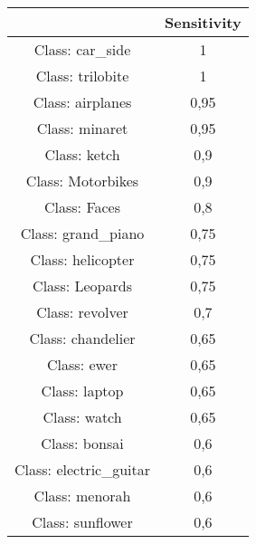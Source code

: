 \begin{table}[H]
\centering
\begin{tabular}{|cc|}
\hline
                                              & \textbf{Sensitivity}      \\ \hline
\multicolumn{1}{|c|}{Class: car\_side}        & \multicolumn{1}{c|}{1}    \\ \hline
\multicolumn{1}{|c|}{Class: trilobite}        & \multicolumn{1}{c|}{1}    \\ \hline
\multicolumn{1}{|c|}{Class: airplanes}        & \multicolumn{1}{c|}{0,95} \\ \hline
\multicolumn{1}{|c|}{Class: minaret}          & \multicolumn{1}{c|}{0,95} \\ \hline
\multicolumn{1}{|c|}{Class: ketch}            & \multicolumn{1}{c|}{0,9}  \\ \hline
\multicolumn{1}{|c|}{Class: Motorbikes}       & \multicolumn{1}{c|}{0,9}  \\ \hline
\multicolumn{1}{|c|}{Class: Faces}            & \multicolumn{1}{c|}{0,8}  \\ \hline
\multicolumn{1}{|c|}{Class: grand\_piano}     & \multicolumn{1}{c|}{0,75} \\ \hline
\multicolumn{1}{|c|}{Class: helicopter}       & \multicolumn{1}{c|}{0,75} \\ \hline
\multicolumn{1}{|c|}{Class: Leopards}         & \multicolumn{1}{c|}{0,75} \\ \hline
\multicolumn{1}{|c|}{Class: revolver}         & \multicolumn{1}{c|}{0,7}  \\ \hline
\multicolumn{1}{|c|}{Class: chandelier}       & \multicolumn{1}{c|}{0,65} \\ \hline
\multicolumn{1}{|c|}{Class: ewer}             & \multicolumn{1}{c|}{0,65} \\ \hline
\multicolumn{1}{|c|}{Class: laptop}           & \multicolumn{1}{c|}{0,65} \\ \hline
\multicolumn{1}{|c|}{Class: watch}            & \multicolumn{1}{c|}{0,65} \\ \hline
\multicolumn{1}{|c|}{Class: bonsai}           & \multicolumn{1}{c|}{0,6}  \\ \hline
\multicolumn{1}{|c|}{Class: electric\_guitar} & \multicolumn{1}{c|}{0,6}  \\ \hline
\multicolumn{1}{|c|}{Class: menorah}          & \multicolumn{1}{c|}{0,6}  \\ \hline
\multicolumn{1}{|c|}{Class: sunflower}        & \multicolumn{1}{c|}{0,6}  \\ \hline

\end{tabular}
\end{table}
